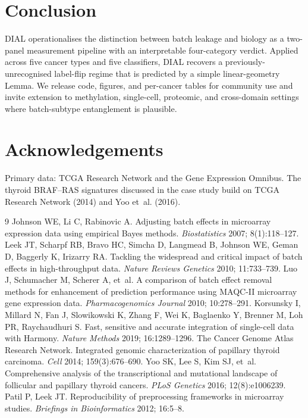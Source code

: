 \documentclass[11pt]{article}
\begin{document}
\section{Conclusion}

DIAL operationalises the distinction between batch leakage and biology as a two-panel measurement pipeline with an interpretable four-category verdict. Applied across five cancer types and five classifiers, DIAL recovers a previously-unrecognised label-flip regime that is predicted by a simple linear-geometry Lemma. We release code, figures, and per-cancer tables for community use and invite extension to methylation, single-cell, proteomic, and cross-domain settings where batch-subtype entanglement is plausible.

\section*{Acknowledgements}

Primary data: TCGA Research Network and the Gene Expression Omnibus. The thyroid BRAF--RAS signatures discussed in the case study build on TCGA Research Network (2014) and Yoo et~al. (2016).

\begin{thebibliography}{9}
 Johnson WE, Li C, Rabinovic A. Adjusting batch effects in microarray expression data using empirical Bayes methods. \emph{Biostatistics} 2007; 8(1):118--127.
 Leek JT, Scharpf RB, Bravo HC, Simcha D, Langmead B, Johnson WE, Geman D, Baggerly K, Irizarry RA. Tackling the widespread and critical impact of batch effects in high-throughput data. \emph{Nature Reviews Genetics} 2010; 11:733--739.
 Luo J, Schumacher M, Scherer A, et~al. A comparison of batch effect removal methods for enhancement of prediction performance using MAQC-II microarray gene expression data. \emph{Pharmacogenomics Journal} 2010; 10:278--291.
 Korsunsky I, Millard N, Fan J, Slowikowski K, Zhang F, Wei K, Baglaenko Y, Brenner M, Loh PR, Raychaudhuri S. Fast, sensitive and accurate integration of single-cell data with Harmony. \emph{Nature Methods} 2019; 16:1289--1296.
 The Cancer Genome Atlas Research Network. Integrated genomic characterization of papillary thyroid carcinoma. \emph{Cell} 2014; 159(3):676--690.
 Yoo SK, Lee S, Kim SJ, et~al. Comprehensive analysis of the transcriptional and mutational landscape of follicular and papillary thyroid cancers. \emph{PLoS Genetics} 2016; 12(8):e1006239.
 Patil P, Leek JT. Reproducibility of preprocessing frameworks in microarray studies. \emph{Briefings in Bioinformatics} 2012; 16:5--8.
\end{thebibliography}
\end{document}
